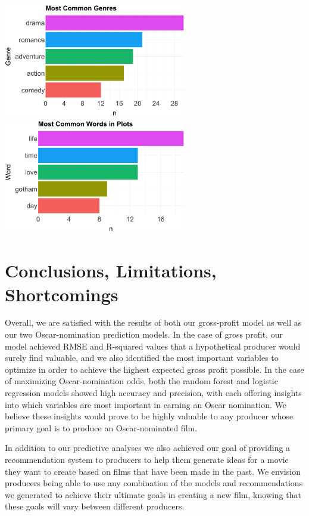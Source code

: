 \documentclass[10pt]{article}
\begin{document}
\begin{center}
\includegraphics[width=8cm]{_assets/_assets_knn/forrest_gump_common_genres.png}
\hspace{1cm}
\includegraphics[width=8cm]{_assets/_assets_knn/forrest_gump_common_words.png}

\end{center}

\section{Conclusions, Limitations, Shortcomings}
Overall, we are satisfied with the results of both our gross-profit model as well as our two Oscar-nomination prediction models. In the case of gross profit, our model achieved RMSE and R-squared values that a hypothetical producer would surely find valuable, and we also identified the most important variables to optimize in order to achieve the highest expected gross profit possible. In the case of maximizing Oscar-nomination odds, both the random forest and logistic regression models showed high accuracy and precision, with each offering insights into which variables are most important in earning an Oscar nomination. We believe these insights would prove to be highly valuable to any producer whose primary goal is to produce an Oscar-nominated film.

In addition to our predictive analyses we also achieved our goal of providing a recommendation system to producers to help them generate ideas for a movie they want to create based on films that have been made in the past. We envision producers being able to use any combination of the models and recommendations we generated to achieve their ultimate goals in creating a new film, knowing that these goals will vary between different producers. 
\end{document}
